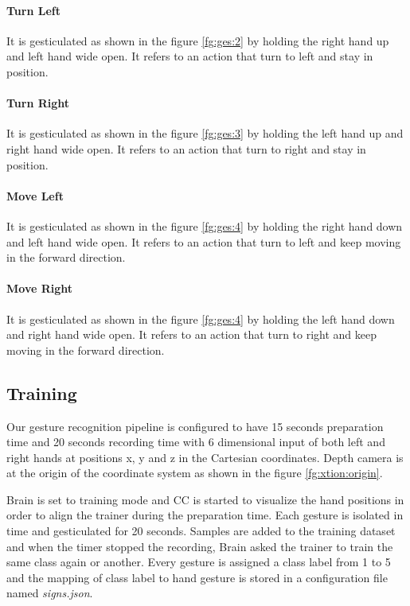 \paragraph*{Turn Left} It is gesticulated as shown in the figure \ref{fg:ges:2} by holding the right hand up and left hand wide open. It refers to an action that turn to left and stay in position. 

\paragraph*{Turn Right} It is gesticulated as shown in the figure \ref{fg:ges:3} by holding the left hand up and right hand wide open. It refers to an action that turn to right and stay in position. 

\paragraph*{Move Left} It is gesticulated as shown in the figure \ref{fg:ges:4} by holding the right hand down and left hand wide open. It refers to an action that turn to left and keep moving in the forward direction.

\paragraph*{Move Right} It is gesticulated as shown in the figure \ref{fg:ges:4} by holding the left hand down and right hand wide open. It refers to an action that turn to right and keep moving in the forward direction.

\subsection{Training} Our gesture recognition pipeline is configured to have 15 seconds preparation time and 20 seconds recording time with 6 dimensional input of both left and right hands at positions x, y and z in the Cartesian coordinates. Depth camera is at the origin of the coordinate system as shown in the figure \ref{fg:xtion:origin}.



Brain is set to training mode and CC is started to visualize the hand positions in order to align the trainer during the preparation time. Each gesture is isolated in time and gesticulated for 20 seconds. Samples are added to the training dataset and when the timer stopped the recording, Brain asked the trainer to train the same class again or another. Every gesture is assigned a class label from 1 to 5 and the mapping of class label to hand gesture is stored in a configuration file named \textit{signs.json}. 

